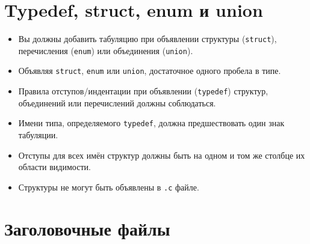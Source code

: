 \documentclass{42-ru}
\begin{document}
    \newpage


    \section{Typedef, struct, enum и union}

        \begin{itemize}

            \item Вы должны добавить табуляцию при объявлении структуры (\texttt{struct}), перечисления (\texttt{enum}) или объединения (\texttt{union}).

            \item Объявляя \texttt{struct}, \texttt{enum} или \texttt{union}, достаточное одного пробела в типе.

            \item Правила отступов/индентации при объявлении (\texttt{typedef}) структур, объединений или перечислений должны соблюдаться.

            \item Имени типа, определяемого \texttt{typedef}, должна предшествовать один знак табуляции.

            \item Отступы для всех имён структур должны быть на одном и том же столбце их области видимости.

            \item Структуры не могут быть объявлены в \texttt{.c} файле.

        \end{itemize}

    \newpage


    \section{Заголовочные файлы}
\end{document}
